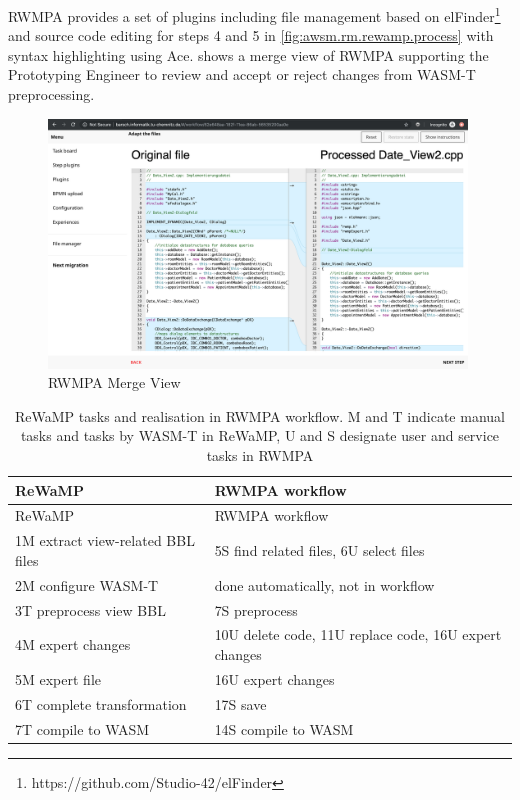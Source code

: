 RWMPA provides a set of plugins including file management based on elFinder\footnote{https://github.com/Studio-42/elFinder} and source code editing for steps 4 and 5 in \cref{fig:awsm.rm.rewamp.process} with syntax highlighting using Ace.
 shows a merge view of RWMPA supporting the Prototyping Engineer to review and accept or reject changes from WASM-T preprocessing.

\begin{figure}
\hypertarget{fig:awsm.rm.rwmpa.screenshot}{%
\centering
\includegraphics[width=0.99\textwidth]{../figures/screenshots/rwmpa-review-preprocessing.png}
\caption{RWMPA Merge View}\label{fig:awsm.rm.rwmpa.screenshot}
}
\end{figure}

\hypertarget{tbl:rewamp-rwmpa}{}
\begin{longtable}[]{@{}ll@{}}
\caption{\label{tbl:rewamp-rwmpa}ReWaMP tasks and realisation in RWMPA workflow.
M and T indicate manual tasks and tasks by WASM-T in ReWaMP, U and S designate user and service tasks in RWMPA}\tabularnewline
\toprule
ReWaMP & RWMPA workflow\tabularnewline
\midrule
\endfirsthead
\toprule
ReWaMP & RWMPA workflow\tabularnewline
\midrule
\endhead
1M extract view-related BBL files & 5S find related files, 6U select files\tabularnewline
2M configure WASM-T & done automatically, not in workflow\tabularnewline
3T preprocess view BBL & 7S preprocess\tabularnewline
4M expert changes & 10U delete code, 11U replace code, 16U expert changes\tabularnewline
5M expert file & 16U expert changes\tabularnewline
6T complete transformation & 17S save\tabularnewline
7T compile to WASM & 14S compile to WASM\tabularnewline
\bottomrule
\end{longtable}


